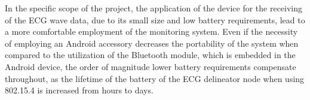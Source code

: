 		In the specific scope of the project, the application of the device for the receiving of the ECG wave data, due to its small size and low battery requirements, lead to a more comfortable employment of the monitoring system. Even if the necessity of employing an Android accessory decreases the portability of the system when compared to the utilization of the Bluetooth module, which is embedded in the Android device, the order of magnitude lower battery requirements compensate throughout, as the lifetime of the battery of the ECG delineator node when using 802.15.4 is increased from hours to days.\\




